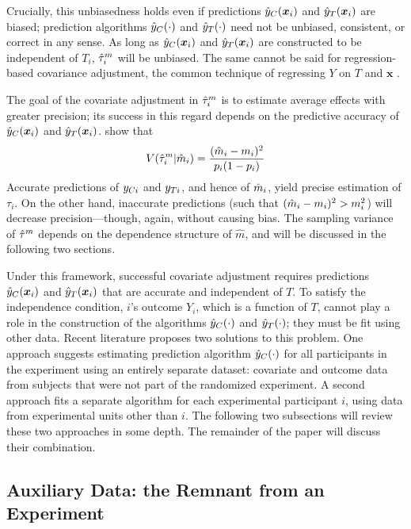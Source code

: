 Crucially, this unbiasedness holds even if predictions $\hat{y}_C(\bm{x}_i)$ and $\hat{y}_T(\bm{x}_i)$ are biased; prediction algorithms $\hat{y}_C(\cdot)$ and $\hat{y}_T(\cdot)$ need not be unbiased, consistent, or correct in any sense.
As long as $\hat{y}_C(\bm{x}_i)$ and $\hat{y}_T(\bm{x}_i)$ are constructed to be independent
of $T_i$, $\hat{\tau}_i^m$ will be unbiased.
The same cannot be said for regression-based covariance
adjustment, the common technique of regressing $Y$ on $T$ and $\bm{x}$
\citep{freedman2008regression}.

The goal of the covariate adjustment in $\hat{\tau}_i^m$ is to estimate average
effects with greater precision;
its success in this regard depends on the predictive accuracy of $\hat{y}_C(\bm{x}_i)$ and $\hat{y}_T(\bm{x}_i)$.
\citet{loop} show that
\begin{equation}
V(\hat{\tau}_i^m|\hat{m}_i)=\frac{(\hat{m}_i-m_i)^2}{p_i(1-p_i)}
\end{equation}
Accurate predictions of $y_{Ci}$ and $y_{Ti}$, and hence of $\hat{m}_i$, yield precise estimation of $\tau_i$.
On the other hand, inaccurate predictions (such that
$(\hat{m}_i-m_i)^2>m_i^2$) will decrease precision---though, again, without
causing bias.
The sampling variance of $\hat{\tau}^m$ depends on the dependence structure of
$\hat{m}$, and will be discussed in the following two sections.

Under this framework, successful covariate adjustment
requires predictions $\hat{y}_C(\bm{x}_i) $ and $\hat{y}_T(\bm{x}_i) $ that are accurate and
independent of $T$.
To satisfy the independence condition, $i$'s outcome $Y_i$, which is a
function of $T$, cannot play a role in the construction of the algorithms $\hat{y}_C(\cdot)$ and
$\hat{y}_T(\cdot)$; they must be fit using other data.
Recent literature proposes two solutions to this problem.
 One approach \citep{rebarEDM} suggests
estimating prediction algorithm $\hat{y}_C(\cdot) $ for all participants in the
experiment using an entirely separate dataset: covariate and outcome data from subjects
that were not part of the randomized experiment.
A second approach \citep{loop} fits a separate algorithm for each
experimental participant $i$, using data from experimental units other
than $i$.
The following two subsections will review these two approaches in some
depth.
The remainder of the paper will discuss their combination.

\subsection{Auxiliary Data: the Remnant from an Experiment}\label{sec:intro.remant}

